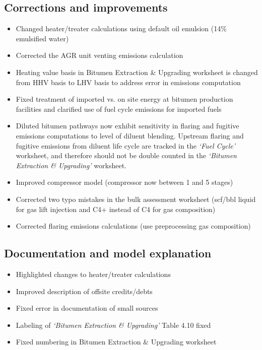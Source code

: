 \documentclass[11pt]{report}
\newcommand{\sheet}[1]{\textit{`{#1}'}}
\begin{document}
\subsection{Corrections and improvements}
\begin{itemize}
\item{Changed heater/treater calculations using default oil emulsion (14\% emulsified water)}
\item{Corrected the AGR unit venting emissions calculation}
\item{Heating value basis in Bitumen Extraction \& Upgrading worksheet is changed from HHV basis to LHV basis to address error in emissions computation}
\item{Fixed treatment of imported vs. on site energy at bitumen production facilities and clarified use of fuel cycle emissions for imported fuels}
\item{Diluted bitumen pathways now exhibit sensitivity in flaring and fugitive emissions computations to level of diluent blending. Upstream flaring and fugitive emissions from diluent life cycle are tracked in the \sheet{Fuel Cycle} worksheet, and therefore should not be double counted in the \sheet{Bitumen Extraction \& Upgrading} worksheet.}
\item{Improved compressor model (compressor now between 1 and 5 stages)}
\item{Corrected two typo mistakes in the bulk assessment worksheet (scf/bbl liquid for gas lift injection and C4+ instead of C4 for gas composition)}
\item{Corrected flaring emissions calculations (use preprocessing gas composition)}

\end{itemize}


\subsection{Documentation and model explanation}
\begin{itemize}
\item{Highlighted changes to heater/treater calculations}
\item{Improved description of offsite credits/debts}
\item{Fixed error in documentation of small sources}
\item{Labeling of \sheet{Bitumen Extraction \& Upgrading} Table 4.10 fixed}
\item{Fixed numbering in Bitumen Extraction \& Upgrading worksheet}
\end{itemize}
\end{document}
